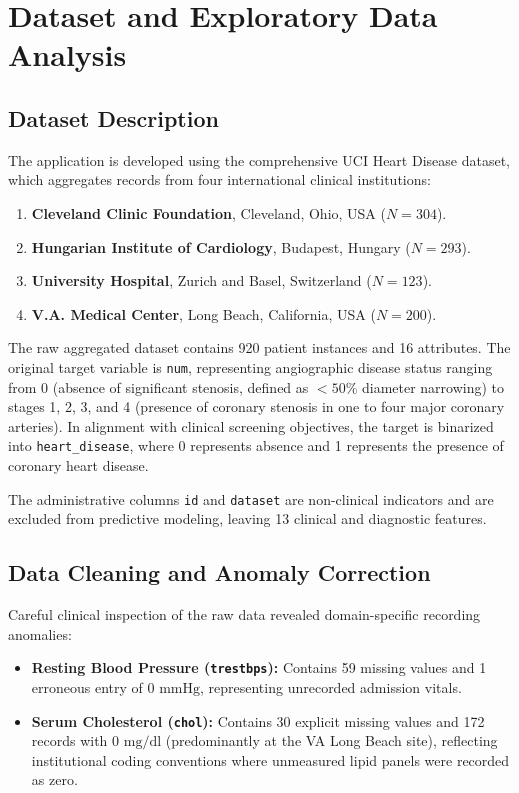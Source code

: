 \documentclass[12pt,a4paper]{report}
\begin{document}
\chapter{Dataset and Exploratory Data Analysis}

\section{Dataset Description}

The application is developed using the comprehensive UCI Heart Disease dataset, which aggregates records from four international clinical institutions:
\begin{enumerate}
\item \textbf{Cleveland Clinic Foundation}, Cleveland, Ohio, USA ($N = 304$).
\item \textbf{Hungarian Institute of Cardiology}, Budapest, Hungary ($N = 293$).
\item \textbf{University Hospital}, Zurich and Basel, Switzerland ($N = 123$).
\item \textbf{V.A. Medical Center}, Long Beach, California, USA ($N = 200$).
\end{enumerate}

The raw aggregated dataset contains 920 patient instances and 16 attributes. The original target variable is \texttt{num}, representing angiographic disease status ranging from 0 (absence of significant stenosis, defined as $<50\%$ diameter narrowing) to stages 1, 2, 3, and 4 (presence of coronary stenosis in one to four major coronary arteries). In alignment with clinical screening objectives, the target is binarized into \texttt{heart\_disease}, where 0 represents absence and 1 represents the presence of coronary heart disease.

The administrative columns \texttt{id} and \texttt{dataset} are non-clinical indicators and are excluded from predictive modeling, leaving 13 clinical and diagnostic features.

\section{Data Cleaning and Anomaly Correction}

Careful clinical inspection of the raw data revealed domain-specific recording anomalies:
\begin{itemize}
\item \textbf{Resting Blood Pressure (\texttt{trestbps}):} Contains 59 missing values and 1 erroneous entry of $0\text{ mmHg}$, representing unrecorded admission vitals.
\item \textbf{Serum Cholesterol (\texttt{chol}):} Contains 30 explicit missing values and 172 records with $0\text{ mg/dl}$ (predominantly at the VA Long Beach site), reflecting institutional coding conventions where unmeasured lipid panels were recorded as zero.
\end{itemize}
\end{document}
